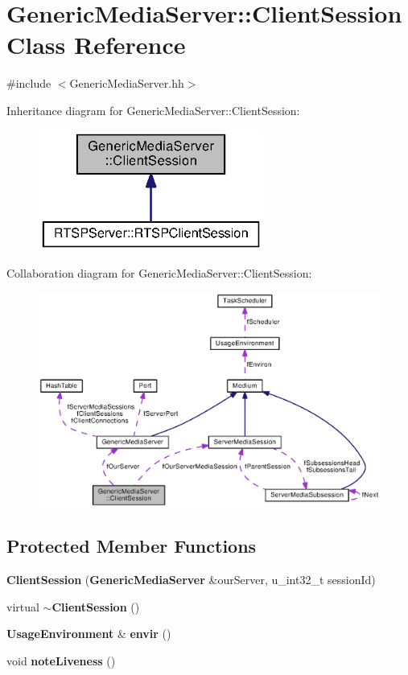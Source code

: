 \section{Generic\+Media\+Server\+:\+:Client\+Session Class Reference}
\label{classGenericMediaServer_1_1ClientSession}


{\ttfamily \#include $<$Generic\+Media\+Server.\+hh$>$}



Inheritance diagram for Generic\+Media\+Server\+:\+:Client\+Session\+:
\nopagebreak
\begin{figure}[H]
\begin{center}
\leavevmode
\includegraphics[width=209pt]{classGenericMediaServer_1_1ClientSession__inherit__graph}
\end{center}
\end{figure}


Collaboration diagram for Generic\+Media\+Server\+:\+:Client\+Session\+:
\nopagebreak
\begin{figure}[H]
\begin{center}
\leavevmode
\includegraphics[width=350pt]{classGenericMediaServer_1_1ClientSession__coll__graph}
\end{center}
\end{figure}
\subsection*{Protected Member Functions}
\begin{DoxyCompactItemize}
\item 
{\bf Client\+Session} ({\bf Generic\+Media\+Server} \&our\+Server, u\+\_\+int32\+\_\+t session\+Id)
\item 
virtual {\bf $\sim$\+Client\+Session} ()
\item 
{\bf Usage\+Environment} \& {\bf envir} ()
\item 
void {\bf note\+Liveness} ()
\end{DoxyCompactItemize}
